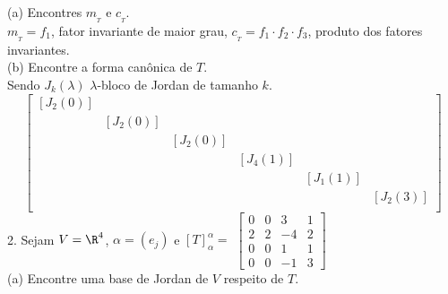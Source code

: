 (a) Encontres \(m_{_T}\) e \(c_{_T}\). \\ 
\textcolor{gris}{\(m_{_T} = f_1\), fator invariante de maior grau, \(c_{_T} = f_1 \cdot f_2 \cdot f_3\), produto dos fatores invariantes.  }\\ 
(b) Encontre a forma canônica de \(T\). \\ 
\textcolor{gris}{Sendo \(J_k(\lambda)\) \(\lambda\)-bloco de Jordan de tamanho \(k\). {\small \[\begin{bmatrix}
 [J_2(0)]&  &  &  &  &   \\  
 & [J_2(0)] &  &  &  &    \\  
 &  & [J_2(0)] &  &  &    \\  
 &  &  & [J_4(1)] &  &  \\  
 &  &  &  & [J_1(1)] &   \\  
 &  &  &  &  & [J_2(3)]  \\  
\end{bmatrix}\]}}
2. Sejam \(V = \R^4\), \(\alpha = (e_j)\) e \([T]^\alpha_\alpha = \) {\small \(\begin{bmatrix}
0 & 0 & 3 & 1 \\ 
2 & 2 & -4 & 2 \\ 
0 & 0 & 1 & 1 \\ 
0 & 0 & -1 & 3  
\end{bmatrix}\)}\vspace{0.3cm}\\ 
(a) Encontre uma base de Jordan de \(V\) respeito de \(T\). \\
